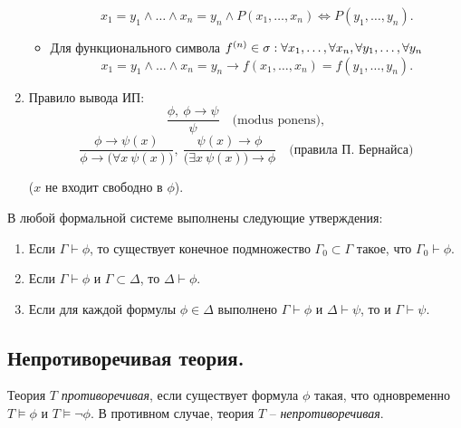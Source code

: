 \begin{definition}
\begin{enumerate}
\begin{itemize}
                        \[
                            x_1 = y_1 \land \ldots \land x_n = y_n \land P(x_1,\ldots,x_n) \iff P(y_1,\ldots,y_n).
                        \]
                  \item Для функционального символа $ f^{(n)}\in\sigma: \\ \forall x_1,\ldots,\forall x_n,\forall y_1,\ldots,\forall y_n $
                        \[
                            x_1 = y_1 \land \ldots \land x_n = y_n \rightarrow f(x_1,\ldots,x_n) = f(y_1,\ldots,y_n).
                        \]
              \end{itemize}
        \item Правило вывода ИП:
              \[
                  \frac{\phi, \ \phi \rightarrow \psi}{\psi} \quad \text{(modus ponens)},
              \]
              \[
                  \frac{\phi \rightarrow\psi(x)}{\phi \rightarrow \big(\forall x \ \psi(x)\big)}, \ \frac{\psi(x)\rightarrow \phi}{\big(\exists x \ \psi(x)\big) \rightarrow \phi} \quad \text{(правила П. Бернайса)}
              \]
              \begin{center}
                  ($ x $ не входит свободно в $ \phi $).
              \end{center}
    \end{enumerate}
\end{definition}

\begin{statement}
    В любой формальной системе выполнены следующие утверждения:
    \begin{enumerate}
        \item Если $\Gamma \vdash \phi $, то существует конечное подмножество $ \Gamma_0 \subset \Gamma $ такое, что $ \Gamma_0 \vdash \phi $.
        \item Если $ \Gamma \vdash \phi $ и $ \Gamma \subset \Delta $, то $ \Delta \vdash \phi $.
        \item Если для каждой формулы $ \phi \in \Delta $ выполнено $ \Gamma \vdash \phi $ и $ \Delta \vdash \psi $, то и $ \Gamma \vdash \psi $.
    \end{enumerate}
\end{statement}

\subsection{Непротиворечивая теория.}

\begin{definition}
    Теория $ T $ \emph{противоречивая}, если существует формула $ \phi $ такая, что одновременно $ T \vDash \phi $ и $ T \vDash \lnot\phi $. В противном случае, теория $ T $ -- \emph{непротиворечивая}.
\end{definition}

